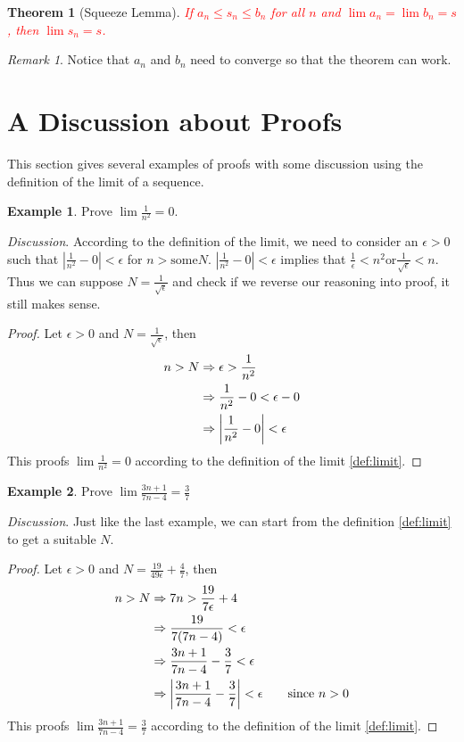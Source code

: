 \documentclass[12pt, lettersize]{book}
\theoremstyle{plain}
\newtheorem{thm}{Theorem}[section]
\theoremstyle{definition}
\newtheorem*{eg}{Example}
\theoremstyle{remark}
\newtheorem*{rem}{Remark}
\begin{document}
		\begin{thm}[Squeeze Lemma]\label{lem: squeeze}
			\textcolor{red}{If $a_n\leq s_n\leq b_n$ for all $n$ and $\lim a_n=\lim b_n=s$, then $\lim s_n=s$.}
		\end{thm}
		\begin{rem}
			Notice that $a_n$ and $b_n$ need to converge so that the theorem can work.
		\end{rem}
	
	\section{A Discussion about Proofs}
		This section gives several examples of proofs with some discussion using the definition of the limit of a sequence.
		\begin{eg}
		Prove $\lim \frac{1}{n^2}=0$.
		\end{eg}
		\emph{Discussion}. According to the definition of the limit, we need to consider an $\epsilon >0$ such that $|\frac{1}{n^2}-0|<\epsilon$ for $n>\text{some}N$.
		$|\frac{1}{n^2}-0|<\epsilon$ implies that $\frac{1}{\epsilon}<n^2 \text{or} \frac{1}{\sqrt{\epsilon}}<n$.
		Thus we can suppose $N=\frac{1}{\sqrt{\epsilon}}$ and check if we reverse our reasoning into proof, it still makes sense. 
		\begin{proof}
		Let $\epsilon>0$ and $N=\frac{1}{\sqrt{\epsilon}}$, then
		\begin{align*}
			n>N &\Rightarrow \epsilon > \frac{1}{n^2}\\
				&\Rightarrow \frac{1}{n^2}-0 < \epsilon -0\\
				&\Rightarrow \abs{\frac{1}{n^2}-0}<\epsilon
		\end{align*}
		This proofs $\lim \frac{1}{n^2}=0$ according to the definition of the limit \ref{def:limit}.
		\end{proof}
		
		\begin{eg}
		Prove $\lim \frac{3n+1}{7n-4}=\frac{3}{7}$
		\end{eg}
		\emph{Discussion}. Just like the last example, we can start from the definition \ref{def:limit} to get a suitable $N$.
		\begin{proof}
			Let $\epsilon>0$ and $N=\frac{19}{49\epsilon}+\frac{4}{7}$, then
		\begin{align*}
			n>N &\Rightarrow 7n>\frac{19}{7\epsilon}+4\\
				&\Rightarrow \frac{19}{7(7n-4)}<\epsilon\\
				&\Rightarrow \frac{3n+1}{7n-4} - \frac{3}{7}<\epsilon\\
				&\Rightarrow \abs{\frac{3n+1}{7n-4} - \frac{3}{7}}<\epsilon\qquad \text{since}\ n>0
		\end{align*}
		This proofs $\lim \frac{3n+1}{7n-4}=\frac{3}{7}$ according to the definition of the limit \ref{def:limit}.
		\end{proof}
		
\end{document}
